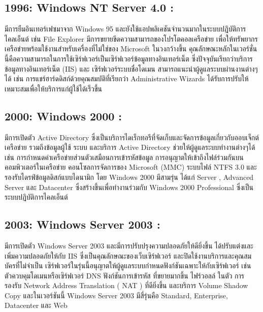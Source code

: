 \hspace{0cm}\subsection{1996: Windows NT Server 4.0 :} มีการยืมอินเทอร์เฟซมาจาก Windows 95 และยังใช้แอปพลิเคชันจำนวนมากในระบบปฏิบัติการไคลเอ็นต์ เช่น File Explorer มีการขยายขีดความสามารถของโปรโตคอลเครือข่าย เพื่อให้ทรัพยากรเครือข่ายพร้อมใช้งานสำหรับเครื่องที่ไม่ใช่ของ Microsoft ในวงกว้างขึ้น คุณลักษณะหลักในเวอร์ชั่นนี้คือความสามารถในการใช้เซิร์ฟเวอร์เป็นเซิร์ฟเวอร์ข้อมูลทางอินเทอร์เน็ต ซึ่งปัจจุบันเรียกว่าบริการข้อมูลทางอินเทอร์เน็ต (IIS) และ เซิร์ฟเวอร์ระบบชื่อโดเมน สามารถแนะนำผู้ดูแลระบบผ่านงานต่างๆได้ เช่น การแชร์ฮาร์ดดิสก์ด้วยคุณสมบัติที่เรียกว่า Administrative Wizards ได้รับการปรับให้เหมาะสมเพื่อให้บริการแก่ผู้ใช้ได้เร็วขึ้น

\hspace{0cm}\subsection{2000: Windows 2000 :} มีการเปิดตัว Active Directory ซึ่งเป็นบริการไดเร็กทอรีที่จัดเก็บและจัดการข้อมูลเกี่ยวกับออบเจ็กต์เครือข่าย รวมถึงข้อมูลผู้ใช้ ระบบ และบริการ Active Directory ช่วยให้ผู้ดูแลระบบทำงานต่างๆได้ เช่น การกำหนดค่าเครือข่ายส่วนตัวเสมือนการเข้ารหัสข้อมูล การอนุญาตให้เข้าถึงไฟล์ร่วมกันบนคอมพิวเตอร์ในเครือข่าย คอนโซลการจัดการของ Microsoft (MMC) ระบบไฟล์ NTFS 3.0 และ รองรับไดรฟ์ข้อมูลดิสก์แบบไดนามิก โดย Windows 2000 มีสามรุ่น ได้แก่ Server , Advanced Server และ Datacenter ซึ่งสร้างขึ้นเพื่อทำงานร่วมกับ Windows 2000 Professional ซึ่งเป็นระบบปฏิบัติการไคลเอ็นต์  

\hspace{0cm}\subsection{2003: Windows Server 2003 :} มีการเปิดตัว Windows Server 2003 และมีการปรับปรุงความปลอดภัยให้ดียิ่งขึ้น ได้ปรับแต่งและเพิ่มความปลอดภัยให้กับ IIS ซึ่งเป็นคุณลักษณะของเว็บเซิร์ฟเวอร์ และปิดใช้งานบริการและคุณสมบัครที่ไม่จำเป็น เซิร์ฟเวอร์ในรุ่นนี้อนุญาตให้ผู้ดูแลระบบกำหนดฟังก์ชันเฉพาะให้กับเซิร์ฟเวอร์ เช่น ตัวควบคุมโดเมนหรือเซิร์ฟเวอร์ DNS   ฟังก์ชันการเข้ารหัส ที่ขยายมากขึ้น ไฟร์วอลล์  ในตัว  การรองรับ Network Address Translation ( NAT ) ที่ดียิ่งขึ้น และบริการ Volume Shadow Copy และในเวอร์ชันนี้ Windows Server 2003 มีสี่รุ่นคือ Standard, Enterprise, Datacenter และ Web 

